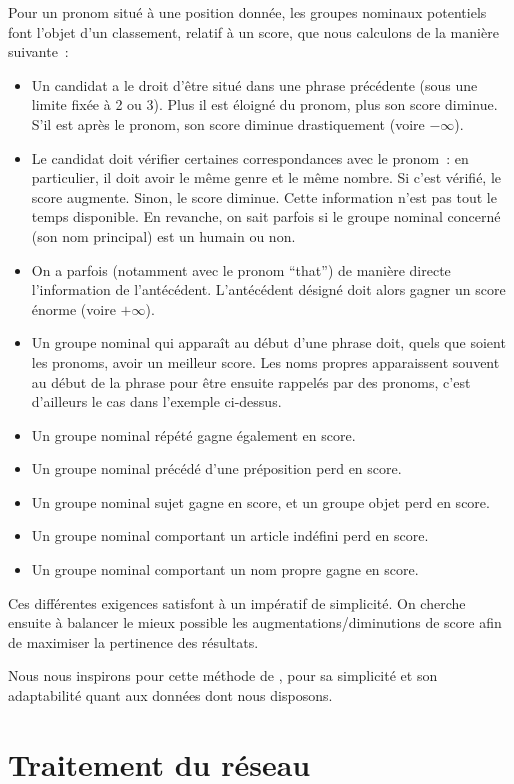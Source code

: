 \documentclass[a4paper, 12pt]{article}
\begin{document}
Pour un pronom situé à une position donnée, les groupes nominaux potentiels font l'objet d'un classement, relatif à un score, que nous calculons de la manière suivante~:

\begin{itemize}
 \item Un candidat a le droit d'être situé dans une phrase précédente (sous une limite fixée à 2 ou 3). Plus il est éloigné du pronom, plus son score diminue. S'il est après le pronom, son score diminue drastiquement (voire $-\infty$).
 \item Le candidat doit vérifier certaines correspondances avec le pronom~: en particulier, il doit avoir le même genre et le même nombre. Si c'est vérifié, le score augmente. Sinon, le score diminue. Cette information n'est pas tout le temps disponible. En revanche, on sait parfois si le groupe nominal concerné (son nom principal) est un humain ou non.
 \item On a parfois (notamment avec le pronom ``that'') de manière directe l'information de l'antécédent. L'antécédent désigné doit alors gagner un score énorme (voire $+\infty$).
 \item Un groupe nominal qui apparaît au début d'une phrase doit, quels que soient les pronoms, avoir un meilleur score. Les noms propres apparaissent souvent au début de la phrase pour être ensuite rappelés par des pronoms, c'est d'ailleurs le cas dans l'exemple ci-dessus.
 \item Un groupe nominal répété gagne également en score.
 \item Un groupe nominal précédé d'une préposition perd en score.
 \item Un groupe nominal sujet gagne en score, et un groupe objet perd en score.
 \item Un groupe nominal comportant un article indéfini perd en score.
 \item Un groupe nominal comportant un nom propre gagne en score.
\end{itemize}

Ces différentes exigences satisfont à un impératif de simplicité. On cherche ensuite à balancer le mieux possible les augmentations/diminutions de score afin de maximiser la pertinence des résultats.

Nous nous inspirons pour cette méthode de \cite{Mitkov:1998:RPR:980691.980712}, pour sa simplicité et son adaptabilité quant aux données dont nous disposons.


\section{Traitement du réseau}\label{Section:Traitement}
\end{document}
